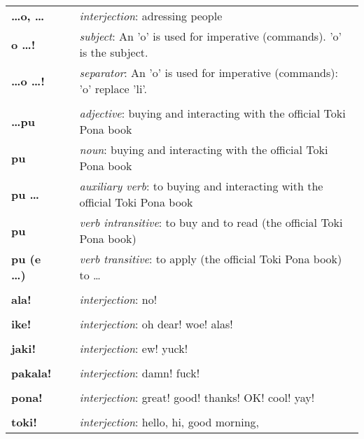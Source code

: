\begin{supertabular}{p{2,5cm}|ll}
\textbf{\dots o, \dots} && \textit{interjection}: adressing people \\ %
\textbf{o \dots !} && \textit{subject}: An 'o' is used for imperative (commands). 'o' is the subject.  \\ %
\textbf{\dots o \dots !} && \textit{separator}: An 'o' is used for imperative (commands): 'o' replace 'li'. \\ %
 && \\ %
%
\textbf{\dots pu} && \textit{adjective}: buying and interacting with the official Toki Pona book \\ 
\textbf{pu} && \textit{noun}: buying and interacting with the official Toki Pona book \\ 
\textbf{pu \dots} && \textit{auxiliary verb}: to buying and interacting with the official Toki Pona book \\ 
\textbf{pu} && \textit{verb intransitive}:  to buy and to read (the official Toki Pona book) \\
\textbf{pu (e \dots)} && \textit{verb transitive}: to apply (the official Toki Pona book) to \dots \\
 && \\ %
%
\textbf{ala!} && \textit{interjection}: no! \\ %
 && \\ %
%
\textbf{ike!} && \textit{interjection}: oh dear! woe! alas! \\ %
 && \\ %
%
\textbf{jaki!} && \textit{interjection}: ew! yuck! \\ %
 && \\ %
%
\textbf{pakala!} && \textit{interjection}: damn! fuck! \\ %
 && \\ %
%
\textbf{pona!} && \textit{interjection}: great! good! thanks! OK! cool! yay! \\ %
 && \\ %
%
\textbf{toki!} && \textit{interjection}: hello, hi, good morning, \\ %
\end{supertabular} \\
%
%


